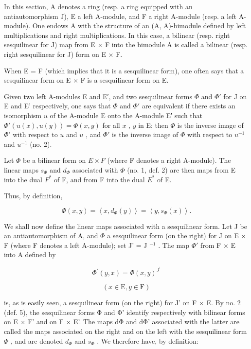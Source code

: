 In this section, A denotes a ring (resp. a ring equipped with an antiautomorphism J), E a left A-module, and F a right A-module (resp. a left A-module). One endows A with the structure of an (A, A)-bimodule defined by left multiplications and right multiplications. In this case, a bilinear (resp. right sesquilinear for J) map from E × F into the bimodule A is called a bilinear (resp. right sesquilinear for J) form on E × F.

When E = F (which implies that it is a sesquilinear form), one often says that a sesquilinear form on E × F is a sesquilinear form on E.

Given two left A-modules E and E′, and two sesquilinear forms \(\Phi\) and \(\Phi'\) for J on E and E' respectively, one says that \(\Phi\) and \(\Phi'\) are equivalent if there exists an isomorphism \(u\) of the A-module E onto the A-module E′ such that \(\Phi'(u(x), u(y)) = \Phi(x, y)\) for all \(x\) , \(y\) in E; then \(\Phi\) is the inverse image of \(\Phi'\) with respect to \(u\) and \(u\) , and \(\Phi'\) is the inverse image of \(\Phi\) with respect to \(u^{-1}\) and \(u^{-1}\) (no. 2).

Let \(\Phi\) be a bilinear form on \(E \times F\) (where F denotes a right A-module). The linear maps \(s_{\Phi}\) and \(d_{\Phi}\) associated with \(\Phi\) (no. 1, def. 2) are then maps from E into the dual \(F^{*}\) of F, and from F into the dual \(E^{*}\) of E.

Thus, by definition,

\[
\Phi (x, y) = \left\langle x, d _ {\Phi} (y) \right\rangle = \left\langle y, s _ {\Phi} (x) \right\rangle .\tag{23}
\]

We shall now define the linear maps associated with a sesquilinear form. Let J be an antiautomorphism of A, and \(\Phi\) a sesquilinear form (on the right) for J on E × F (where F denotes a left A-module); set J' = J \(^{-1}\) . The map \(\Phi'\) from F × E into A defined by

\[
\Phi^ {\prime} (y, x) = \Phi (x, y) ^ {J ^ {\prime}}
\]

\[
(x \in \mathrm{E}, y \in \mathrm{F})
\]

is, as is easily seen, a sesquilinear form (on the right) for J' on F × E. By no. 2 (def. 5), the sesquilinear forms Φ and Φ' identify respectively with bilinear forms on E × F' and on F × E'. The maps dΦ and dΦ' associated with the latter are called the maps associated on the right and on the left with the sesquilinear form \(\Phi\) , and are denoted \(d_{\Phi}\) and \(s_{\Phi}\) . We therefore have, by definition:

